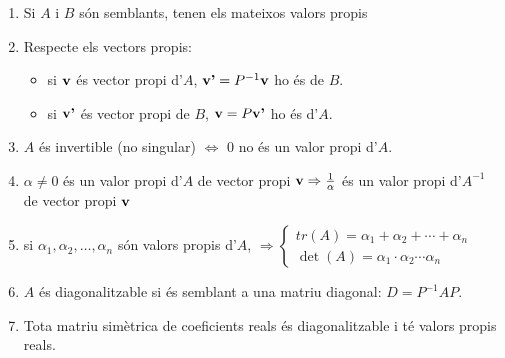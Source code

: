 \documentclass{beamer}
\begin{document}
\begin{frame}
  \begin{enumerate}
    \item Si $A$ i $B$ són semblants, tenen els mateixos valors propis
    \item Respecte els vectors propis:
    \begin{itemize}
      \item si $\textbf{v}$ és vector propi d'$A$, $\textbf{v'}=P^{-1}\textbf{v}$ ho és de $B$.
      \item si $\textbf{v'}$ és vector propi de $B$, $\textbf{v}=P\textbf{v'}$ ho és d'$A$.
    \end{itemize}
    \item $A$ és invertible (no singular) $\Leftrightarrow$ 0 no és un valor propi d'$A$.
    \item $\alpha \neq 0$ és un valor propi d'$A$ de vector propi $\textbf{v}\Rightarrow \frac{1}{\alpha}$ és un valor propi d'$A^{-1}$ de vector propi $\textbf{v}$
    \item si $\alpha_1,\alpha_2, \ldots, \alpha_n$ són valors propis d'$A$, $\Rightarrow \left\{ \begin{matrix}tr(A)=\alpha_1+\alpha_2+ \cdots + \alpha_n\\\det(A)=\alpha_1 \cdot \alpha_2 \cdots  \alpha_n\end{matrix}\right.$
    \item $A$ és diagonalitzable si és semblant a una matriu diagonal: $D=P^{-1}AP$.
    \item Tota matriu simètrica de coeficients reals és diagonalitzable i té valors propis reals.
  \end{enumerate}
\end{frame}
\end{document}
